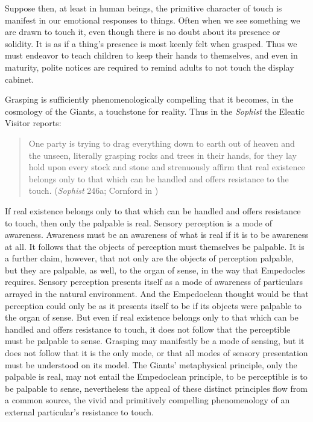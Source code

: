 Suppose then, at least in human beings, the primitive character of touch is manifest in our emotional responses to things. Often when we see something we are drawn to touch it, even though there is no doubt about its presence or solidity. It is as if a thing's presence is most keenly felt when grasped. Thus we must endeavor to teach children to keep their hands to themselves, and even in maturity, polite notices are required to remind adults to not touch the display cabinet. 

Grasping is sufficiently phenomenologically compelling that it becomes, in the cosmology of the Giants, a touchstone for reality. Thus in the \emph{Sophist} the Eleatic Visitor reports: 
\begin{quote}
    One party is trying to drag everything down to earth out of heaven and the unseen, literally grasping rocks and trees in their hands, for they lay hold upon every stock and stone and strenuously affirm that real existence belongs only to that which can be handled and offers resistance to the touch. (\emph{Sophist} 246a; Cornford in \citealt[990]{Hamilton:1961fk})
\end{quote}
If real existence belongs only to that which can be handled and offers resistance to touch, then only the palpable is real. Sensory perception is a mode of awareness. Awareness must be an awareness of what is real if it is to be awareness at all. It follows that the objects of perception must themselves be palpable. It is a further claim, however, that not only are the objects of perception palpable, but they are palpable, as well, to the organ of sense, in the way that Empedocles requires. Sensory perception presents itself as a mode of awareness of particulars arrayed in the natural environment. And the Empedoclean thought would be that perception could only be as it presents itself to be if its objects were palpable to the organ of sense. But even if real existence belongs only to that which can be handled and offers resistance to touch, it does not follow that the perceptible must be palpable to sense. Grasping may manifestly be a mode of sensing, but it does not follow that it is the only mode, or that all modes of sensory presentation must be understood on its model. The Giants' metaphysical principle, only the palpable is real, may not entail the Empedoclean principle, to be perceptible is to be palpable to sense, nevertheless the appeal of these distinct principles flow from a common source, the vivid and primitively compelling phenomenology of an external particular's resistance to touch.

